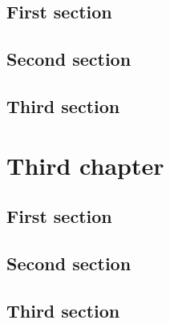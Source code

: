 \documentclass{tstextbook}
\begin{document}
    \section{First section}
    \Blindtext


    \section{Second section}
    \Blindtext


    \section{Third section}
    \Blindtext



    \chapter{Third chapter}

    \begin{summary}
        \blindtext
    \end{summary}


    \section{First section}
    \Blindtext


    \section{Second section}
    \Blindtext


    \section{Third section}
    \Blindtext


    \printbibliography{}


    \printindex
\end{document}
